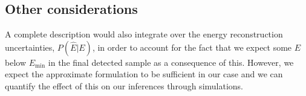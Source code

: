 \documentclass[fontsize=12pt]{article}
\begin{document}
\subsection{Other considerations}
A complete description would also integrate over the energy reconstruction uncertainties, $P(\hat{E} | E)$, in order to account for the fact that we expect some $E$ below $E_\mathrm{min}$ in the final detected sample as a consequence of this. However, we expect the approximate formulation to be sufficient in our case and we can quantify the effect of this on our inferences through simulations. 



\end{document}
